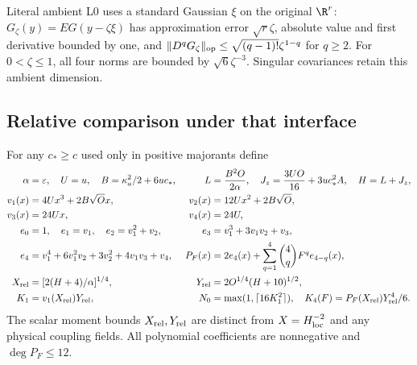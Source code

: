 Literal ambient L0 uses a standard Gaussian $\xi$ on the original
$\R^r$: $G_\zeta(y)=E G(y-\zeta\xi)$ has approximation error
$\sqrt r\zeta$, absolute value and first derivative bounded by one,
and $\|D^qG_\zeta\|_{\rm op}\le\sqrt{(q-1)!}\zeta^{1-q}$ for
$q\ge2$. For $0<\zeta\le1$, all four norms are bounded by
$\sqrt6\zeta^{-3}$. Singular covariances retain this ambient dimension.

\subsection{Relative comparison under that interface}
\label{sva:relative}

For any $c_*\ge c$ used only in positive majorants define
\begin{align}\label{sva:constants}
 \alpha&=\varepsilon,\quad U=u,\quad B=\kappa_a^2/2+6uc_*,
 &L&={B^2O\over2\alpha},\quad J_z={3UO\over16}+3uc_*^2A,
 \quad H=L+J_z,\nonumber\\
 v_1(x)&=4Ux^3+2B\sqrt O x,&v_2(x)&=12Ux^2+2B\sqrt O,\nonumber\\
 v_3(x)&=24Ux,&v_4(x)&=24U,\nonumber\\
 e_0&=1,\quad e_1=v_1,\quad e_2=v_1^2+v_2,
 &e_3&=v_1^3+3v_1v_2+v_3,\nonumber\\
 e_4&=v_1^4+6v_1^2v_2+3v_2^2+4v_1v_3+v_4,
 &P_F(x)&=2e_4(x)+\sum_{q=1}^4\binom4q F^qe_{4-q}(x),\nonumber\\
 X_{\rm rel}&=[2(H+4)/\alpha]^{1/4},
 &Y_{\rm rel}&=2O^{1/4}(H+10)^{1/2},\nonumber\\
 K_1&=v_1(X_{\rm rel})Y_{\rm rel},
 &N_0&=\max(1,\lceil16K_1^2\rceil),\quad
 K_4(F)=P_F(X_{\rm rel})Y_{\rm rel}^4/6.
\end{align}
The scalar moment bounds $X_{\rm rel},Y_{\rm rel}$ are distinct from
$X=H^{-2}_{\rm loc}$ and any physical coupling fields. All polynomial
coefficients are nonnegative and $\deg P_F\le12$.

